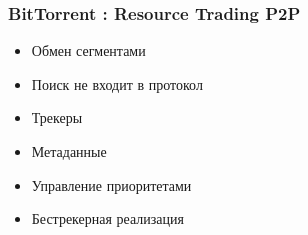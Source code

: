 \documentclass[xetex,mathserif,serif]{beamer}
\begin{document}
	\begin{frame}
		\frametitle{BitTorrent : Resource Trading P2P}
		\begin{itemize}
			\item Обмен сегментами
			\item Поиск не входит в протокол
			\item Трекеры
			\item Метаданные
			\item Управление приоритетами
			\item Бестрекерная реализация
		\end{itemize}
	\end{frame}
\end{document}
